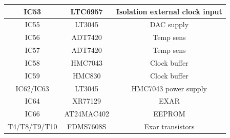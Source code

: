 \begin{longtable}{|c|c|c|}
	IC53	&	LTC6957		&  Isolation external clock input			\\	\hline	
	IC55	&	LT3045		&  DAC supply			\\	\hline	
	IC56 & ADT7420 & Temp sens \\ \hline
	IC57 & ADT7420 & Temp sens \\ \hline
	IC58	&	HMC7043		&  	Clock buffer		\\ \hline
	IC59	&	HMC830		&  	Clock buffer		\\	\hline
	IC62/IC63		& LT3045	& HMC7043 power supply	\\ \hline			
	IC64 & XR77129 & EXAR \\ \hline
	IC66 & AT24MAC402 & EEPROM \\ \hline
	T4/T8/T9/T10 & FDMS7608S & Exar transistors\\ \hline




																										
\end{longtable}



